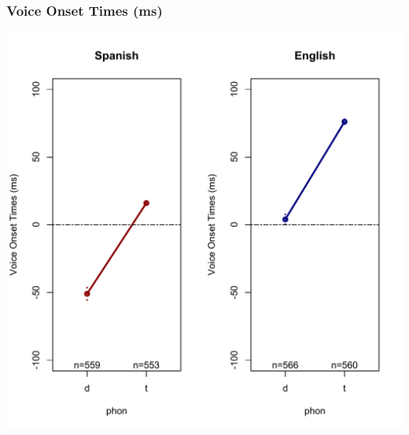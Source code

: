 \documentclass{beamer}
\begin{document}

\begin{frame}
\frametitle{Voice Onset Times (ms)}
\begin{center}
\includegraphics[scale=.375]{simplified/fig10_votbilinguals.pdf}
\end{center}
\end{frame}
\end{document}
